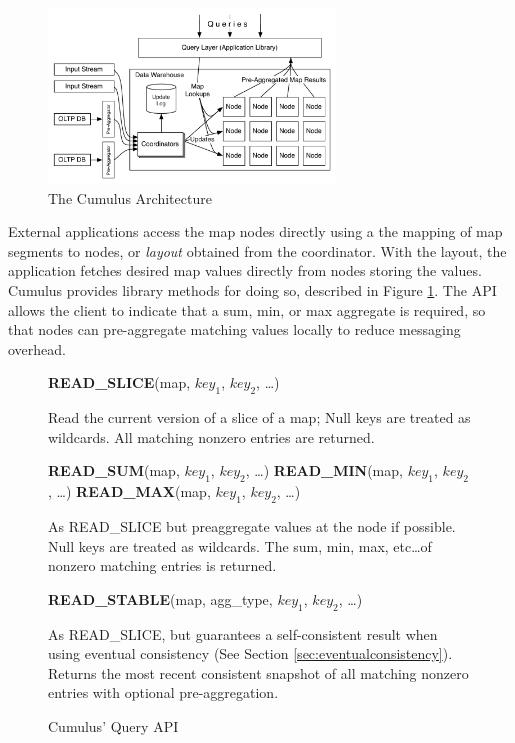 \documentclass{vldb}
\begin{document}
\begin{figure}
\includegraphics[width=3in]{graphics/Architecture.pdf}
\caption{The Cumulus Architecture}
\label{fig:architecture}
\end{figure}

External applications access the map nodes directly using a the mapping of map segments to nodes, or \textit{layout} obtained from the coordinator.  With the layout, the application fetches desired map values directly from nodes storing the values.  Cumulus provides library methods for doing so, described in Figure \ref{fig:architecture}.  The API allows the client to indicate that a sum, min, or max aggregate is required, so that nodes can pre-aggregate matching values locally to reduce messaging overhead.

\begin{figure}
\begin{algorithmic}
\STATE \textbf{READ\_SLICE}(map, $key_1$, $key_2$, \ldots) 
\end{algorithmic}
\hspace*{0.2in}\parbox[b]{3in}{Read the current version of a slice of a map; Null keys are treated as wildcards. All matching nonzero entries are returned.}
\begin{algorithmic}
\STATE \textbf{READ\_SUM}(map, $key_1$, $key_2$, \ldots)
\STATE \textbf{READ\_MIN}(map, $key_1$, $key_2$, \ldots)
\STATE \textbf{READ\_MAX}(map, $key_1$, $key_2$, \ldots)
\end{algorithmic}
\hspace*{0.2in}\parbox[b]{3in}{As READ\_SLICE but preaggregate values at the node if possible.  Null keys are treated as wildcards. The sum, min, max, etc\ldots of nonzero matching entries is returned.}
\begin{algorithmic}
\STATE \textbf{READ\_STABLE}(map, agg\_type, $key_1$, $key_2$, \ldots)
\end{algorithmic}
\hspace*{0.2in}\parbox[b]{3in}{As READ\_SLICE, but guarantees a self-consistent result when using eventual consistency (See Section \ref{sec:eventualconsistency}).  Returns the most recent consistent snapshot of all matching nonzero entries with optional pre-aggregation.}
\caption{Cumulus' Query API}
\label{fig:queryapi}
\end{figure}
\end{document}
